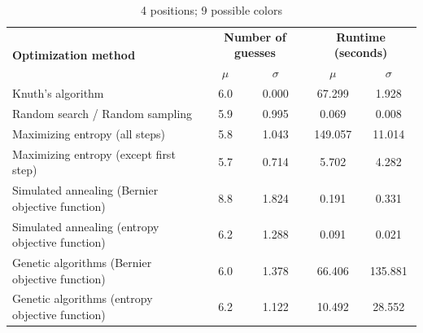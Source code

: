 \documentclass[11pt]{article}
\begin{document}
\begin{table}[h!]
\begin{center}
\begin{tabular}{l c c c c}
\toprule
\multirow{2}{*}{\bfseries Optimization method} 		& \multicolumn{2}{c}{\bfseries Number of guesses} 		& \multicolumn{2}{c}{\bfseries Runtime (seconds)}	\\
\cmidrule(lr){2-3}  \cmidrule(lr){4-5}				& $\mu$ & $\sigma$								& $\mu$ & $\sigma$							\\
\cmidrule(lr){1-5}
Knuth's algorithm							& 6.0 & 0.000									& 67.299 & 1.928							\\
Random search / Random sampling				& 5.9 & 0.995									& 0.069 & 0.008							\\
Maximizing entropy (all steps)					& 5.8 & 1.043									& 149.057 & 11.014							\\
Maximizing entropy (except first step)			& 5.7 & 0.714									& 5.702 & 4.282							\\
Simulated annealing (Bernier objective function)	& 8.8 & 1.824									& 0.191 & 0.331							\\
Simulated annealing (entropy objective function)	& 6.2 & 1.288									& 0.091 & 0.021							\\
Genetic algorithms (Bernier objective function)		& 6.0 & 1.378									& 66.406 & 135.881							\\
Genetic algorithms (entropy objective function)		& 6.2 & 1.122									& 10.492 & 28.552							\\
\bottomrule
\end{tabular}
\end{center}
\caption{4 positions; 9 possible colors}
\label{fig:compare_4_9}
\end{table}

\newpage
\end{document}
